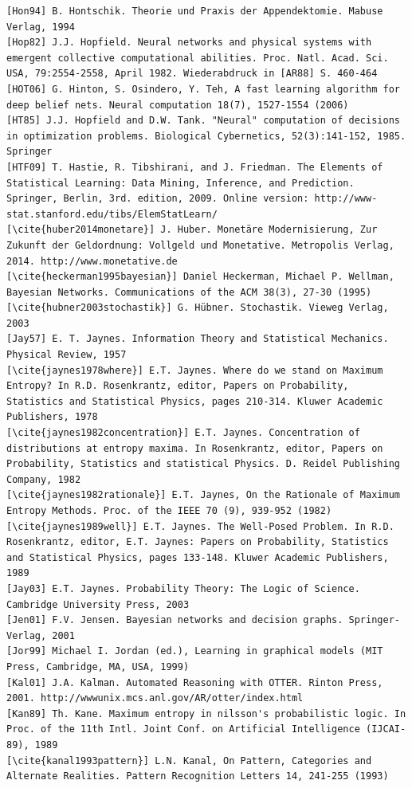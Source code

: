 \documentclass[10pt]{article}
\begin{document}
\begin{verbatim}
[Hon94] B. Hontschik. Theorie und Praxis der Appendektomie. Mabuse Verlag, 1994
[Hop82] J.J. Hopfield. Neural networks and physical systems with emergent collective computational abilities. Proc. Natl. Acad. Sci. USA, 79:2554-2558, April 1982. Wiederabdruck in [AR88] S. 460-464
[HOT06] G. Hinton, S. Osindero, Y. Teh, A fast learning algorithm for deep belief nets. Neural computation 18(7), 1527-1554 (2006)
[HT85] J.J. Hopfield and D.W. Tank. "Neural" computation of decisions in optimization problems. Biological Cybernetics, 52(3):141-152, 1985. Springer
[HTF09] T. Hastie, R. Tibshirani, and J. Friedman. The Elements of Statistical Learning: Data Mining, Inference, and Prediction. Springer, Berlin, 3rd. edition, 2009. Online version: http://www-stat.stanford.edu/tibs/ElemStatLearn/
[\cite{huber2014monetare}] J. Huber. Monetäre Modernisierung, Zur Zukunft der Geldordnung: Vollgeld und Monetative. Metropolis Verlag, 2014. http://www.monetative.de
[\cite{heckerman1995bayesian}] Daniel Heckerman, Michael P. Wellman, Bayesian Networks. Communications of the ACM 38(3), 27-30 (1995)
[\cite{hubner2003stochastik}] G. Hübner. Stochastik. Vieweg Verlag, 2003
[Jay57] E. T. Jaynes. Information Theory and Statistical Mechanics. Physical Review, 1957
[\cite{jaynes1978where}] E.T. Jaynes. Where do we stand on Maximum Entropy? In R.D. Rosenkrantz, editor, Papers on Probability, Statistics and Statistical Physics, pages 210-314. Kluwer Academic Publishers, 1978
[\cite{jaynes1982concentration}] E.T. Jaynes. Concentration of distributions at entropy maxima. In Rosenkrantz, editor, Papers on Probability, Statistics and statistical Physics. D. Reidel Publishing Company, 1982
[\cite{jaynes1982rationale}] E.T. Jaynes, On the Rationale of Maximum Entropy Methods. Proc. of the IEEE 70 (9), 939-952 (1982)
[\cite{jaynes1989well}] E.T. Jaynes. The Well-Posed Problem. In R.D. Rosenkrantz, editor, E.T. Jaynes: Papers on Probability, Statistics and Statistical Physics, pages 133-148. Kluwer Academic Publishers, 1989
[Jay03] E.T. Jaynes. Probability Theory: The Logic of Science. Cambridge University Press, 2003
[Jen01] F.V. Jensen. Bayesian networks and decision graphs. Springer-Verlag, 2001
[Jor99] Michael I. Jordan (ed.), Learning in graphical models (MIT Press, Cambridge, MA, USA, 1999)
[Kal01] J.A. Kalman. Automated Reasoning with OTTER. Rinton Press, 2001. http://wwwunix.mcs.anl.gov/AR/otter/index.html
[Kan89] Th. Kane. Maximum entropy in nilsson's probabilistic logic. In Proc. of the 11th Intl. Joint Conf. on Artificial Intelligence (IJCAI-89), 1989
[\cite{kanal1993pattern}] L.N. Kanal, On Pattern, Categories and Alternate Realities. Pattern Recognition Letters 14, 241-255 (1993)

\end{verbatim}
\end{document}
